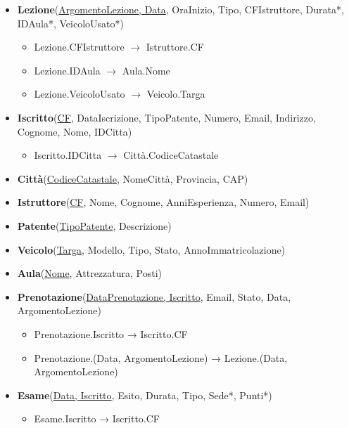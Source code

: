 \documentclass[10pt,twoside]{article}
\begin{document}
{{        \begin{itemize}
            \item \textbf{Lezione}(\underline{ArgomentoLezione, Data}, OraInizio, Tipo, CFIstruttore, Durata*, IDAula*, VeicoloUsato*)
            \begin{itemize}
                \item Lezione.CFIstruttore  $\rightarrow$ Istruttore.CF
                \item Lezione.IDAula  $\rightarrow$ Aula.Nome
                \item Lezione.VeicoloUsato $\rightarrow$ Veicolo.Targa
            \end{itemize}
            \item \textbf{Iscritto}(\underline{CF}, DataIscrizione, TipoPatente, Numero, Email, Indirizzo, Cognome, Nome, IDCitta)
            \begin{itemize}
                \item Iscritto.IDCitta $\rightarrow$ Città.CodiceCatastale
            \end{itemize}
            \item \textbf{Città}(\underline{CodiceCatastale}, NomeCittà, Provincia, CAP)
            \item \textbf{Istruttore}(\underline{CF}, Nome, Cognome, AnniEsperienza, Numero, Email)
            \item \textbf{Patente}(\underline{TipoPatente}, Descrizione)
            \item \textbf{Veicolo}(\underline{Targa}, Modello, Tipo, Stato, AnnoImmatricolazione)
            \item \textbf{Aula}(\underline{Nome}, Attrezzatura, Posti)
            \item \textbf{Prenotazione}(\underline{DataPrenotazione, Iscritto}, Email, Stato, Data, ArgomentoLezione)
            \begin{itemize}
                \item Prenotazione.Iscritto → Iscritto.CF
                \item Prenotazione.(Data, ArgomentoLezione) → Lezione.(Data, ArgomentoLezione)
            \end{itemize}
            \item \textbf{Esame}(\underline{Data, Iscritto}, Esito, Durata, Tipo, Sede*, Punti*)
            \begin{itemize}
                \item Esame.Iscritto → Iscritto.CF
            \end{itemize}

\end{itemize}}}
\end{document}
